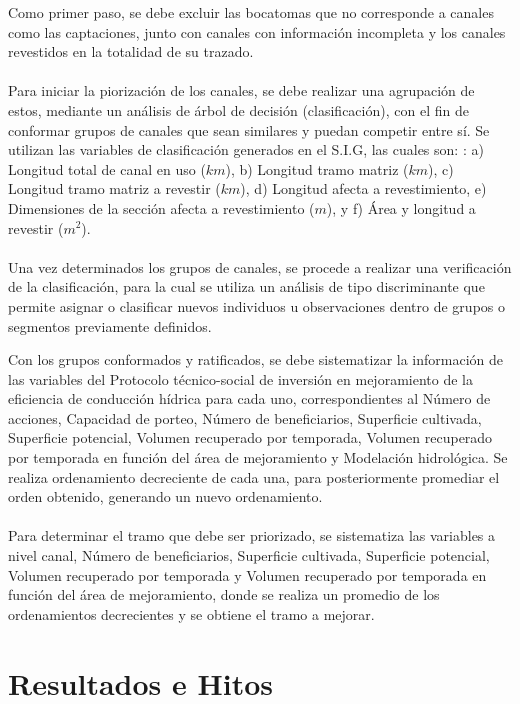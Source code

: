 \documentclass[]{article}
\begin{document}
Como primer paso, se debe excluir las bocatomas que no corresponde a canales como las captaciones, junto con canales con información incompleta y los canales revestidos en la totalidad de su trazado. \\
\\
Para iniciar la piorización de los canales, se debe realizar una agrupación de estos, mediante un análisis de árbol de decisión (clasificación), con el fin de conformar grupos de canales que sean similares y puedan competir entre sí. Se utilizan las variables de clasificación generados en el S.I.G, las cuales son: : a) Longitud total de canal en uso ($km$), b) Longitud tramo matriz ($km$), c) Longitud tramo matriz a revestir ($km$), d) Longitud afecta a revestimiento, e) Dimensiones de la sección afecta a revestimiento ($m$), y f) Área y longitud a revestir ($m^2$). \\
\\
Una vez determinados los grupos de canales, se procede a realizar una verificación de la clasificación, para la cual se utiliza un análisis de tipo discriminante que permite asignar o clasificar nuevos individuos u observaciones dentro de grupos o segmentos previamente definidos.

Con los grupos conformados y ratificados, se debe sistematizar la información de las variables del Protocolo técnico-social de inversión en mejoramiento de la eficiencia de conducción hídrica para cada uno, correspondientes al Número de acciones, Capacidad de porteo, Número de beneficiarios, Superficie cultivada, Superficie potencial, Volumen recuperado por temporada, Volumen recuperado por temporada en función del área de mejoramiento y Modelación hidrológica. Se realiza ordenamiento decreciente de cada una, para posteriormente promediar el orden obtenido, generando un nuevo ordenamiento.\\
\\
Para determinar el tramo que debe ser priorizado, se sistematiza las variables a nivel canal, Número de beneficiarios, Superficie cultivada, Superficie potencial, Volumen recuperado por temporada y Volumen recuperado por temporada en función del área de mejoramiento, donde se realiza un promedio de los ordenamientos decrecientes y se obtiene el tramo a mejorar.



\clearpage
\section{Resultados e Hitos}
\end{document}
